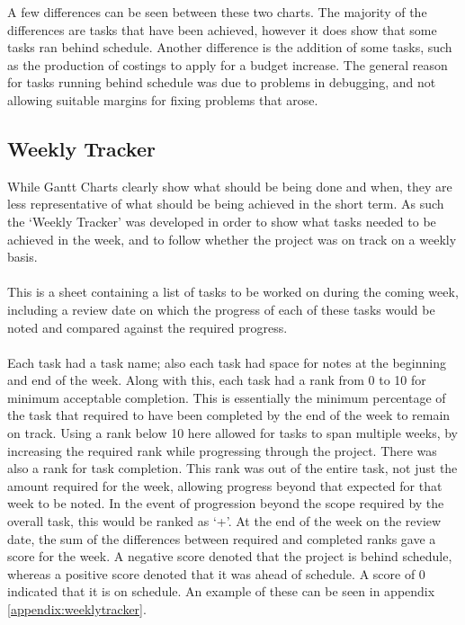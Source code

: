 \noindent
A few differences can be seen between these two charts.
The majority of the differences are tasks that have been achieved, however it does show that some tasks ran behind schedule.
Another difference is the addition of some tasks, such as the production of costings to apply for a budget increase.
The general reason for tasks running behind schedule was due to problems in debugging, and not allowing suitable margins for fixing problems that arose.

\subsection{Weekly Tracker}
While Gantt Charts clearly show what should be being done and when, they are less representative of what should be being achieved in the short term.
As such the `Weekly Tracker' was developed in order to show what tasks needed to be achieved in the week, and to follow whether the project was on track on a weekly basis.
\\
\\
This is a sheet containing a list of tasks to be worked on during the coming week, including a review date on which the progress of each of these tasks would be noted and compared against the required progress.
\\
\\
Each task had a task name; also each task had space for notes at the beginning and end of the week.
Along with this, each task had a rank from 0 to 10 for minimum acceptable completion.
This is essentially the minimum percentage of the task that required to have been completed by the end of the week to remain on track.
Using a rank below 10 here allowed for tasks to span multiple weeks, by increasing the required rank while progressing through the project.
There was also a rank for task completion.
This rank was out of the entire task, not just the amount required for the week, allowing progress beyond that expected for that week to be noted.
In the event of progression beyond the scope required by the overall task, this would be ranked as `+'.
At the end of the week on the review date, the sum of the differences between required and completed ranks gave a score for the week.
A negative score denoted that the project is behind schedule, whereas a positive score denoted that it was ahead of schedule.
A score of 0 indicated that it is on schedule.
An example of these can be seen in appendix \ref{appendix:weeklytracker}.
\\
\\
